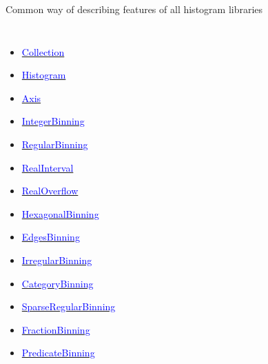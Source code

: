 \documentclass[aspectratio=169]{beamer}
\begin{document}
\begin{frame}{Common way of describing features of all histogram libraries}
\vspace{0.25 cm}
\scriptsize
\begin{columns}[t]
\begin{itemize}
  \item \href{https://github.com/scikit-hep/aghast/blob/master/specification.adoc\#collection}{\textcolor{blue}{Collection}}
  \item \href{https://github.com/scikit-hep/aghast/blob/master/specification.adoc\#histogram}{\textcolor{blue}{Histogram}}
  \item \href{https://github.com/scikit-hep/aghast/blob/master/specification.adoc\#axis}{\textcolor{blue}{Axis}}
  \item \href{https://github.com/scikit-hep/aghast/blob/master/specification.adoc\#integerbinning}{\textcolor{blue}{IntegerBinning}}
  \item \href{https://github.com/scikit-hep/aghast/blob/master/specification.adoc\#regularbinning}{\textcolor{blue}{RegularBinning}}
  \item \href{https://github.com/scikit-hep/aghast/blob/master/specification.adoc\#realinterval}{\textcolor{blue}{RealInterval}}
  \item \href{https://github.com/scikit-hep/aghast/blob/master/specification.adoc\#realoverflow}{\textcolor{blue}{RealOverflow}}
  \item \href{https://github.com/scikit-hep/aghast/blob/master/specification.adoc\#hexagonalbinning}{\textcolor{blue}{HexagonalBinning}}
  \item \href{https://github.com/scikit-hep/aghast/blob/master/specification.adoc\#edgesbinning}{\textcolor{blue}{EdgesBinning}}
  \item \href{https://github.com/scikit-hep/aghast/blob/master/specification.adoc\#irregularbinning}{\textcolor{blue}{IrregularBinning}}
  \item \href{https://github.com/scikit-hep/aghast/blob/master/specification.adoc\#categorybinning}{\textcolor{blue}{CategoryBinning}}
  \item \href{https://github.com/scikit-hep/aghast/blob/master/specification.adoc\#sparseregularbinning}{\textcolor{blue}{SparseRegularBinning}}
  \item \href{https://github.com/scikit-hep/aghast/blob/master/specification.adoc\#fractionbinning}{\textcolor{blue}{FractionBinning}}
  \item \href{https://github.com/scikit-hep/aghast/blob/master/specification.adoc\#predicatebinning}{\textcolor{blue}{PredicateBinning}}

\end{itemize}
\end{columns}
\end{frame}
\end{document}
